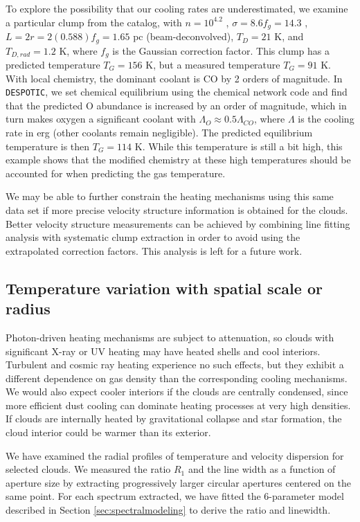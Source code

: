 To explore the possibility that our cooling rates are underestimated, we
examine a particular clump from the catalog, with $n=10^{4.2}$ \percc,
$\sigma=8.6 f_g = 14.3$ \kms, $L = 2r = 2(0.588)f_g = 1.65$ pc
(beam-deconvolved), $T_D=21$ K, and $T_{D,rad} = 1.2$ K, where $f_g$ is the
Gaussian correction factor.  This clump has a
predicted temperature $T_{G}=156$ K, but a measured temperature $T_{G}=91$
K.  With local chemistry, the dominant coolant is CO by 2 orders of magnitude.
In \texttt{DESPOTIC}, we set chemical equilibrium using the \citet{Nelson1999a}
chemical network code and find that the predicted O abundance is increased by
an order of magnitude, which in turn makes oxygen a significant coolant with
$\Lambda_{O} \approx 0.5 \Lambda_{CO}$, where $\Lambda$ is the cooling rate in
erg \pers \percc (other coolants remain negligible).   The predicted
equilibrium temperature is then $T_{G}=114$ K.  While this temperature is
still a bit high, this example shows that the modified chemistry at these high
temperatures should be accounted for when predicting the gas temperature.

We may be able to further constrain the heating mechanisms using this same data
set if more precise velocity structure information is obtained for the clouds.
Better velocity structure measurements can be achieved by combining line
fitting analysis with systematic clump extraction in order to avoid using the
extrapolated correction factors.  This analysis is left for a future work.



\subsection{Temperature variation with spatial scale or radius}
Photon-driven heating mechanisms are subject to attenuation, so clouds with
significant X-ray or UV heating may have heated shells and cool interiors.
Turbulent and cosmic ray heating experience no such effects, but they exhibit a
different dependence on gas density than the corresponding cooling mechanisms.
We would also expect cooler interiors if the clouds are centrally condensed, since
more efficient dust cooling can dominate heating processes at very high
densities.  If clouds are internally heated by gravitational collapse and star
formation, the cloud interior could be warmer than its exterior.  

We have examined the radial profiles of temperature and velocity
dispersion for selected clouds.  We measured the ratio $R_1$ and the line width
as a function of aperture size by extracting progressively larger circular
apertures centered on the same point.  For each spectrum extracted, we have
fitted the 6-parameter model described in Section \ref{sec:spectralmodeling} to
derive the ratio and linewidth.

